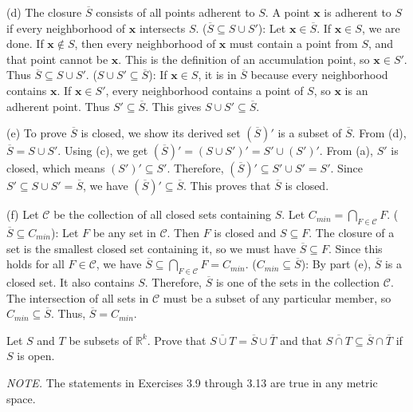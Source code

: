 (d) The closure $\overline{S}$ consists of all points adherent to $S$. A point $\mathbf{x}$ is adherent to $S$ if every neighborhood of $\mathbf{x}$ intersects $S$.
($\overline{S} \subseteq S \cup S'$): Let $\mathbf{x} \in \overline{S}$. If $\mathbf{x} \in S$, we are done. If $\mathbf{x} \notin S$, then every neighborhood of $\mathbf{x}$ must contain a point from $S$, and that point cannot be $\mathbf{x}$. This is the definition of an accumulation point, so $\mathbf{x} \in S'$. Thus $\overline{S} \subseteq S \cup S'$.
($S \cup S' \subseteq \overline{S}$): If $\mathbf{x} \in S$, it is in $\overline{S}$ because every neighborhood contains $\mathbf{x}$. If $\mathbf{x} \in S'$, every neighborhood contains a point of $S$, so $\mathbf{x}$ is an adherent point. Thus $S' \subseteq \overline{S}$. This gives $S \cup S' \subseteq \overline{S}$.

(e) To prove $\overline{S}$ is closed, we show its derived set $(\overline{S})'$ is a subset of $\overline{S}$. From (d), $\overline{S} = S \cup S'$. Using (c), we get $(\overline{S})' = (S \cup S')' = S' \cup (S')'$. From (a), $S'$ is closed, which means $(S')' \subseteq S'$. Therefore, $(\overline{S})' \subseteq S' \cup S' = S'$. Since $S' \subseteq S \cup S' = \overline{S}$, we have $(\overline{S})' \subseteq \overline{S}$. This proves that $\overline{S}$ is closed.

(f) Let $\mathcal{C}$ be the collection of all closed sets containing $S$. Let $C_{min} = \bigcap_{F \in \mathcal{C}} F$.
($\overline{S} \subseteq C_{min}$): Let $F$ be any set in $\mathcal{C}$. Then $F$ is closed and $S \subseteq F$. The closure of a set is the smallest closed set containing it, so we must have $\overline{S} \subseteq F$. Since this holds for all $F \in \mathcal{C}$, we have $\overline{S} \subseteq \bigcap_{F \in \mathcal{C}} F = C_{min}$.
($C_{min} \subseteq \overline{S}$): By part (e), $\overline{S}$ is a closed set. It also contains $S$. Therefore, $\overline{S}$ is one of the sets in the collection $\mathcal{C}$. The intersection of all sets in $\mathcal{C}$ must be a subset of any particular member, so $C_{min} \subseteq \overline{S}$.
Thus, $\overline{S} = C_{min}$.

\begin{problembox}

Let $S$ and $T$ be subsets of $\mathbb{R}^k$. Prove that $\overline{S \cup T} = \overline{S} \cup \overline{T}$ and that $\overline{S \cap T} \subseteq \overline{S} \cap \overline{T}$ if $S$ is open.

\textit{NOTE.} The statements in Exercises 3.9 through 3.13 are true in any metric space.
\end{problembox}


